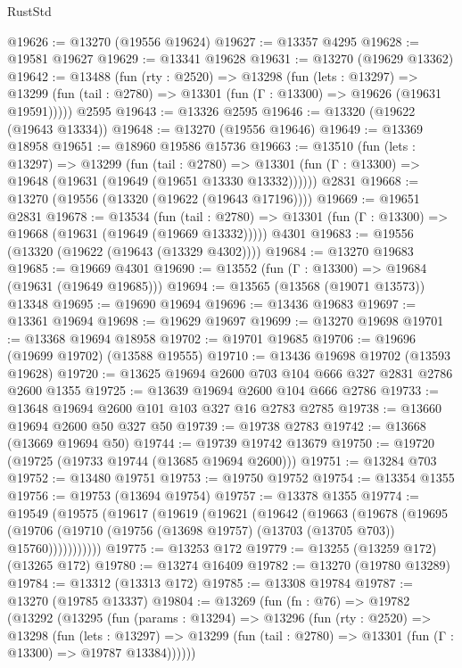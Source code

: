 \begin{lexlean}{RustStd}
\begin{coremodule}
@19626 := @13270 (@19556 @19624)
@19627 := @13357 @4295
@19628 := @19581 @19627
@19629 := @13341 @19628
@19631 := @13270 (@19629 @13362)
@19642 := @13488
    (fun (rty : @2520) =>
    @13298
      (fun (lets : @13297) =>
      @13299 (fun (tail : @2780) => @13301 (fun (Γ : @13300) => @19626 (@19631 @19591)))))
    @2595
@19643 := @13326 @2595
@19646 := @13320 (@19622 (@19643 @13334))
@19648 := @13270 (@19556 @19646)
@19649 := @13369 @18958
@19651 := @18960 @19586 @15736
@19663 := @13510
    (fun (lets : @13297) =>
    @13299
      (fun (tail : @2780) =>
      @13301 (fun (Γ : @13300) => @19648 (@19631 (@19649 (@19651 @13330 @13332))))))
    @2831
@19668 := @13270 (@19556 (@13320 (@19622 (@19643 @17196))))
@19669 := @19651 @2831
@19678 := @13534
    (fun (tail : @2780) => @13301 (fun (Γ : @13300) => @19668 (@19631 (@19649 (@19669 @13332)))))
    @4301
@19683 := @19556 (@13320 (@19622 (@19643 (@13329 @4302))))
@19684 := @13270 @19683
@19685 := @19669 @4301
@19690 := @13552 (fun (Γ : @13300) => @19684 (@19631 (@19649 @19685)))
@19694 := @13565 (@13568 (@19071 @13573)) @13348
@19695 := @19690 @19694
@19696 := @13436 @19683
@19697 := @13361 @19694
@19698 := @19629 @19697
@19699 := @13270 @19698
@19701 := @13368 @19694 @18958
@19702 := @19701 @19685
@19706 := @19696 (@19699 @19702) (@13588 @19555)
@19710 := @13436 @19698 @19702 (@13593 @19628)
@19720 := @13625 @19694 @2600 @703 @104 @666 @327 @2831 @2786 @2600 @1355
@19725 := @13639 @19694 @2600 @104 @666 @2786
@19733 := @13648 @19694 @2600 @101 @103 @327 @16 @2783 @2785
@19738 := @13660 @19694 @2600 @50 @327 @50
@19739 := @19738 @2783
@19742 := @13668 (@13669 @19694 @50)
@19744 := @19739 @19742 @13679
@19750 := @19720 (@19725 (@19733 @19744 (@13685 @19694 @2600)))
@19751 := @13284 @703
@19752 := @13480 @19751
@19753 := @19750 @19752
@19754 := @13354 @1355
@19756 := @19753 (@13694 @19754)
@19757 := @13378 @1355
@19774 := @19549
    (@19575
      (@19617
        (@19619
          (@19621
            (@19642
              (@19663
                (@19678
                  (@19695
                    (@19706 (@19710 (@19756 (@13698 @19757) (@13703 (@13705 @703)) @15760)))))))))))
@19775 := @13253 @172
@19779 := @13255 (@13259 @172) (@13265 @172)
@19780 := @13274 @16409
@19782 := @13270 (@19780 @13289)
@19784 := @13312 (@13313 @172)
@19785 := @13308 @19784
@19787 := @13270 (@19785 @13337)
@19804 := @13269
    (fun (fn : @76) =>
    @19782
      (@13292
        (@13295
          (fun (params : @13294) =>
          @13296
            (fun (rty : @2520) =>
            @13298
              (fun (lets : @13297) =>
              @13299 (fun (tail : @2780) => @13301 (fun (Γ : @13300) => @19787 @13384))))))

\end{coremodule}
\end{lexlean}
